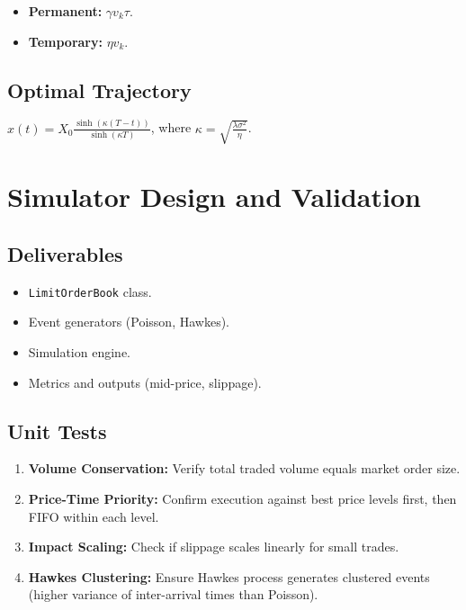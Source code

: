 \documentclass{article}
\begin{document}
\begin{itemize}
    \item \textbf{Permanent:} $\gamma v_k \tau$.
    \item \textbf{Temporary:} $\eta v_k$.
\end{itemize}

\subsection{Optimal Trajectory}

$x(t) = X_0 \frac{\sinh(\kappa(T-t))}{\sinh(\kappa T)}$, where $\kappa = \sqrt{\frac{\lambda \sigma^2}{\eta}}$.

\section{Simulator Design and Validation}

\subsection{Deliverables}

\begin{itemize}
    \item \texttt{LimitOrderBook} class.
    \item Event generators (Poisson, Hawkes).
    \item Simulation engine.
    \item Metrics and outputs (mid-price, slippage).
\end{itemize}

\subsection{Unit Tests}

\begin{enumerate}
    \item \textbf{Volume Conservation:} Verify total traded volume equals market order size.
    \item \textbf{Price-Time Priority:}  Confirm execution against best price levels first, then FIFO within each level.
    \item \textbf{Impact Scaling:} Check if slippage scales linearly for small trades.
    \item \textbf{Hawkes Clustering:} Ensure Hawkes process generates clustered events (higher variance of inter-arrival times than Poisson).
\end{enumerate}
\end{document}
